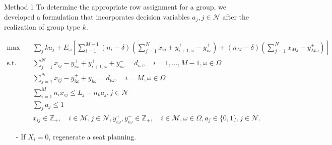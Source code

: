   \begin{frame}{Method 1}
    \scriptsize
    To determine the appropriate row assignment for a group, we developed a formulation that incorporates decision variables $a_j, j \in \mathcal{N}$ after the realization of group type $k$.
    
      \begin{tiny}
        \begin{equation}
        \begin{aligned}
        \max \quad & \sum_{j} k a_j + E_{\omega}\left[\sum_{i=1}^{M-1} (n_i-\delta) (\sum_{j= 1}^{N} x_{ij} + y_{i+1,\omega}^{+} - y_{i \omega}^{+}) + (n_{M}-\delta) (\sum_{j= 1}^{N} x_{Mj} - y_{M \omega}^{+})\right] \\
        \text {s.t.} \quad & \sum_{j= 1}^{N} x_{ij}-y_{i \omega}^{+}+
        y_{i+1, \omega}^{+} + y_{i \omega}^{-}=d_{i \omega}, \quad i = 1,\ldots,M-1, \omega \in \Omega \\
        & \sum_{j= 1}^{N} x_{ij} -y_{i \omega}^{+}+y_{i \omega}^{-}=d_{i \omega}, \quad i = M, \omega \in \Omega \\
        & \sum_{i=1}^{M} n_{i} x_{ij} \leq L_j - n_k a_j, j \in \mathcal{N} \\
        & \sum_{j} a_j \leq 1 \\
        & x_{ij} \in \mathbb{Z}_{+}, \quad i \in \mathcal{M}, j \in \mathcal{N}, y_{i \omega}^{+}, y_{i \omega}^{-} \in \mathbb{Z}_{+}, \quad i \in \mathcal{M}, \omega \in \Omega,  a_j \in \{0,1\}, j \in \mathcal{N}.
        \end{aligned}
      \end{equation}
    \end{tiny}
    \begin{itemize}      
      \item[-] If $X_i = 0$, regenerate a seat planning.
    \end{itemize}
  \end{frame}

